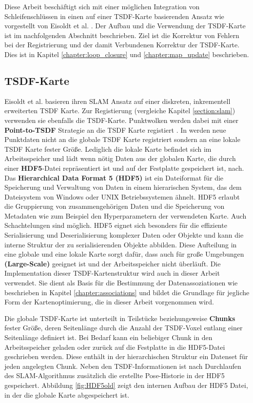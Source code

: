 Diese Arbeit beschäftigt sich mit einer möglichen Integration von Schleifenschlüssen in einen auf einer TSDF-Karte basierenden Ansatz wie vorgestellt von Eisoldt et al. \cite{HATSDF}. Der Aufbau und die Verwendung der TSDF-Karte ist im nachfolgenden Abschnitt beschrieben. Ziel ist die Korrektur von Fehlern bei der Registrierung und der damit Verbundenen Korrektur der TSDF-Karte. Dies ist in Kapitel \ref{chapter:loop_closure} und \ref{chapter:map_update} beschrieben.

\subsection{TSDF-Karte}
\label{section:tsdf_map}

Eisoldt et al. \cite{HATSDF} basieren ihren SLAM Ansatz auf einer diskreten, inkrementell erweiterten TSDF Karte. Zur Registierung (vergleiche Kapitel \ref{section:slam}) verwenden sie ebenfalls die TSDF-Karte. Punktwolken werden dabei mit einer \textbf{Point-to-TSDF} Strategie an die TSDF Karte registiert \cite{HATSDF}.
In \cite{HATSDF} werden neue Punktdaten nicht an die globale TSDF Karte registriert sondern an eine lokale TSDF Karte fester Größe. Lediglich die lokale Karte befindet sich im Arbeitsspeicher und lädt wenn nötig Daten aus der globalen Karte, die durch einer \textbf{HDF5}-Datei repräsentiert ist und auf der Festplatte gespeichert ist, nach. Das \textbf{Hierarchical Data Format 5 (HDF5)} \cite{hdf5} ist ein Dateiformat für die Speicherung und Verwaltung von Daten in einem hierarischen System, das dem Dateisystem von Windows oder UNIX Betriebssystemen ähnelt. HDF5 erlaubt die Gruppierung von zusammengehörigen Daten und die Speicherung von Metadaten wie zum Beispiel den Hyperparametern der verwendeten Karte. Auch Schachtelungen sind möglich. HDF5 eignet sich besonders für die effiziente Serialisierung und Deserialisierung komplexer Daten oder Objekte und kann die interne Struktur der zu serialisierenden Objekte abbilden.
Diese Aufteilung in eine globale und eine lokale Karte sorgt dafür, dass \cite{HATSDF} auch für große Umgebungen \textbf{(Large-Scale)} geeignet ist und der Arbeitsspeicher nicht überläuft. Die Implementation dieser TSDF-Kartenstruktur wird auch in dieser Arbeit verwendet. Sie dient als Basis für die Bestimmung der Datenassoziationen wie beschrieben in Kapitel \ref{chapter:associations} und bildet die Grundlage für jegliche Form der Kartenoptimierung, die in dieser Arbeit vorgenommen wird.

Die globale TSDF-Karte ist unterteilt in Teilstücke beziehungsweise \textbf{Chunks} fester Größe, deren Seitenlänge durch die Anzahl der TSDF-Voxel entlang einer Seitenlänge definiert ist. Bei Bedarf kann ein beliebiger Chunk in den Arbeitsspeicher geladen oder zurück auf die Festplatte in die HDF5-Datei geschrieben werden. Diese enthält in der hierarchischen Struktur ein Datenset für jeden angelegten Chunk. Neben den TSDF-Informationen ist nach Durchlaufen des SLAM-Algorithmus zusätzlich die erstellte Pose-Historie in der HDF5 gespeichert.
Abbildung \ref{fig:HDF5old} zeigt den internen Aufbau der HDF5 Datei, in der die globale Karte abgespeichert ist.

